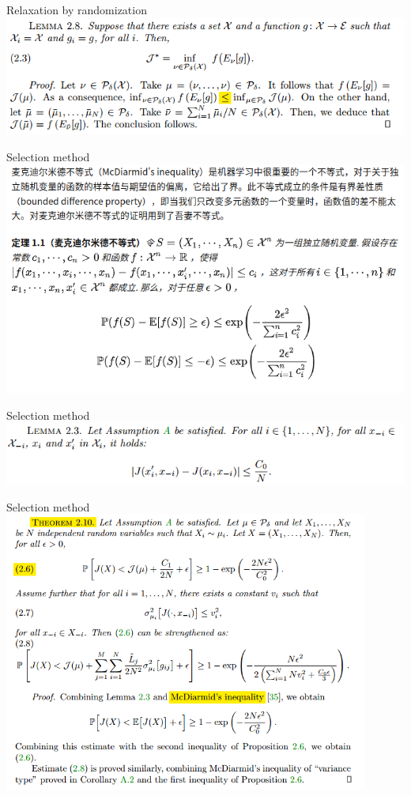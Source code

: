 \documentclass{beamer}
\begin{document}
\begin{frame}{Relaxation by randomization}
	\includegraphics[width=\textwidth]{kde/3.png}
\end{frame}

\begin{frame}{Selection method}
	\includegraphics[width=\textwidth]{kde/5.png}
\end{frame}

\begin{frame}{Selection method}
	\includegraphics[width=\textwidth]{kde/15.png}
\end{frame}

\begin{frame}{Selection method}
	\includegraphics[width=0.9\textwidth]{kde/4.png}
\end{frame}
\end{document}
